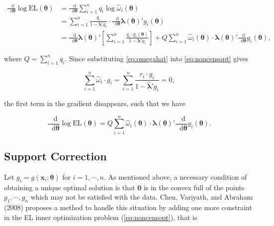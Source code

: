 \documentclass[article]{jss}
\renewcommand{\|}{\,|\,}
\begin{document}
\begin{equation}
\begin{split}
\frac{\mathop{}\!\mathrm{d}}{\mathop{}\!\mathrm{d}\bm \theta}\log \textrm{EL}(\bm \theta) &= \frac{\mathop{}\!\mathrm{d}}{\mathop{}\!\mathrm{d}\bm \theta}\sum_{i=1}^n q_i \log \hat \omega_i(\bm \theta) \\
&= \sum_{i=1}^n \frac{q_i}{1 - \bm \lambda'g_i} \cdot \frac{\mathop{}\!\mathrm{d}}{\mathop{}\!\mathrm{d}\bm \theta}\bm \lambda(\bm \theta)'g_i(\bm \theta) \\
&= \frac{\mathop{}\!\mathrm{d}}{\mathop{}\!\mathrm{d}\bm \theta}\bm \lambda(\bm \theta)' \left[\sum_{i=1}^n \frac{q_i \cdot g_i(\bm \theta)}{1 - \bm \lambda'g_i}\right] + Q \sum_{i=1}^n \hat \omega_i(\bm \theta) \cdot \bm \lambda(\bm \theta)' \frac{\mathop{}\!\mathrm{d}}{\mathop{}\!\mathrm{d}\bm \theta}g_i(\bm \theta),
\end{split}
\end{equation}

where \(Q = \sum_{i=1}^n q_i\). Since substituting \eqref{eq:omegahat} into \eqref{eq:noncensopt} gives

\begin{equation}
\sum_{i=1}^n \hat \omega_i \cdot g_i = \sum_{i=1}^n \frac{r_i \cdot g_i}{1 - \hat{\bm \lambda}'g_i} = 0,
\end{equation}

the first term in the gradient disappears, such that we have

\begin{equation}
\frac{\mathop{}\!\mathrm{d}}{\mathop{}\!\mathrm{d}\bm \theta}\log \textrm{EL}(\bm \theta) = Q \sum_{i=1}^n \hat \omega_i(\bm \theta) \cdot \bm \lambda(\bm \theta)' \frac{\mathop{}\!\mathrm{d}}{\mathop{}\!\mathrm{d}\bm \theta}g_i(\bm \theta).
\label{eq:gradel}
\end{equation}

\hypertarget{support-correction}{%
\subsection{Support Correction}\label{support-correction}}

Let \(g_i = g(\bm x_i;\bm \theta)\) for \(i = 1,\cdots, n\). As mentioned above, a necessary condition of obtaining a unique optimal solution is that \(\bm 0\) is in the convex full of the points \(g_1,\cdots,g_n\) which may not be satisfied with the data. Chen, Variyath, and Abraham (2008) proposes a method to handle this situation by adding one more constraint in the EL inner optimization problem (\ref{eq:noncensopt}), that is
\end{document}
